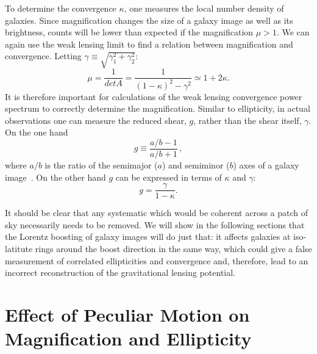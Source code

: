 \documentclass[useAMS,fleqn,usenatbib]{mn2e}
\begin{document}
To determine the convergence $\kappa$, one measures the local number density of galaxies. 
Since magnification changes the size of a galaxy image as well as its brightness,
counts will be lower than expected if the magnification $\mu > 1$. We can again use
the weak lensing limit to find a relation between magnification and convergence. Letting
$\gamma \equiv \sqrt{\gamma_1^2+\gamma_2^2}$:
\begin{equation}
\mu = \frac{1}{det A} = \frac{1}{(1-\kappa)^2-\gamma^2}\simeq1+2\kappa .
\end{equation}
It is therefore important for calculations
of the weak lensing convergence power spectrum to correctly determine the magnification.
Similar to ellipticity, in  actual observations one can measure the reduced shear, $g$,
rather than the shear itself, $\gamma$.  
On the one hand
\begin{equation}\label{rs}
g\equiv\frac{a/b-1}{a/b+1}\,,
\end{equation}
where $a/b$ is the ratio of the semimajor ($a$) and semiminor ($b$)
axes of a galaxy image~\citep{Schneider:2005ka}.
On the other hand $g$  can be expressed in terms
of $\kappa$ and $\gamma$:
\begin{equation}\label{rs}
g=\frac{\gamma}{1-\kappa}.
\end{equation}


It should be clear that any systematic which would be coherent across a patch of sky necessarily
needs to be removed. We will show in the following sections that the Lorentz boosting of galaxy images will
do just that: it affects galaxies at iso-latitute rings around the boost direction
in the same way, which could give a false measurement of correlated ellipticities and convergence 
and, therefore, lead to an incorrect reconstruction of the gravitational lensing potential.


\section{Effect of Peculiar Motion on Magnification and Ellipticity}
\label{peculiar}
\end{document}
